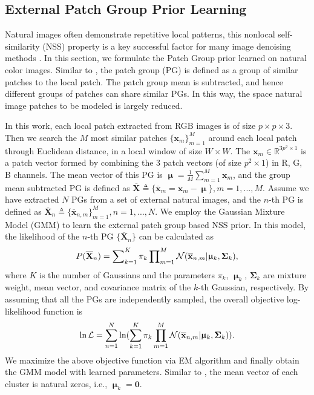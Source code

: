 \documentclass[10pt,twocolumn,letterpaper]{article}
\begin{document}
\subsection{External Patch Group Prior Learning}

Natural images often demonstrate repetitive local patterns, this nonlocal self-similarity (NSS) property is a key successful factor for many image denoising methods \cite{nlm,bm3d,lssc,wnnm,pgpd}. In this section, we formulate the Patch Group prior learned on natural color images. Similar to \cite{pgpd}, the patch group (PG) is defined as a group of similar patches to the local patch. The patch group mean is subtracted, and hence different groups of patches can share similar PGs. In this way, the space natural image patches to be modeled is largely reduced. 

In this work, each local patch extracted from RGB images is of size $p\times p \times 3$. Then we search the $M$ most similar patches $\{\mathbf{x}_{m}\}_{m=1}^{M}$ around each local patch through Euclidean distance, in a local window of size $W\times W$. The $\mathbf{x}_{m}\in \mathbb{R}^{3p^{2}\times1}$ is a patch vector formed by combining the 3 patch vectors (of size $p^{2}\times 1$) in R, G, B channels. The mean vector of this PG is $\boldsymbol{\upmu}=\frac{1}{M}\sum_{m=1}^{M}\mathbf{x}_{m}$, and the group mean subtracted PG is defined as $\mathbf{\overline{X}}\triangleq \{\mathbf{\overline{x}}_{m}=\mathbf{x}_{m}-\boldsymbol{\upmu}\}, m=1,...,M$. Assume we have extracted $N$ PGs from a set of external natural images, and the $n$-th PG is defined as $\mathbf{\overline{X}}_{n}\triangleq \{\mathbf{\overline{x}}_{n,m}\}_{m=1}^{M}, n=1,...,N$. We employ the Gaussian Mixture Model (GMM) to learn the external patch group based NSS prior. In this model, the likelihood of the $n$-th PG $\{\mathbf{\overline{X}}_{n}\}$ can be calculated as
\vspace{-2mm}
\begin{equation}\label{equ1}\vspace{-2mm}
P(\mathbf{\overline{X}}_{n})  = \sum\nolimits_{k=1}^{K}\pi_{k}\prod\nolimits_{m=1}^{M}\mathcal{N}(\mathbf{\overline{x}}_{n,m}|\boldsymbol{\upmu}_{k},\mathbf{\Sigma}_{k}),
\end{equation}
where $K$ is the number of Gaussians and the parameters $\pi_{k}$, $\boldsymbol{\upmu}_{k}$, $\mathbf{\Sigma}_{k}$ are mixture weight, mean vector, and covariance matrix of the $k$-th Gaussian, respectively. By assuming that all the PGs are independently sampled, the overall objective log-likelihood function is
\vspace{-2mm}
\begin{equation}\label{equ2}\vspace{-2mm}
\begin{split}
\ln\mathcal{L}=\sum_{n=1}^{N} \ln(\sum_{k=1}^{K}\pi_{k}\prod_{m=1}^{M}\mathcal{N}(\mathbf{\overline{x}}_{n,m}|\boldsymbol{\upmu}_{k},\mathbf{\Sigma}_{k})).
\end{split}
\end{equation} 
We maximize the above objective function via EM algorithm \cite{em} and finally obtain the GMM model with learned parameters. Similar to \cite{pgpd}, the mean vector of each cluster is natural zeros, i.e., $\boldsymbol{\upmu}_{k}=\mathbf{0}$.
\end{document}
